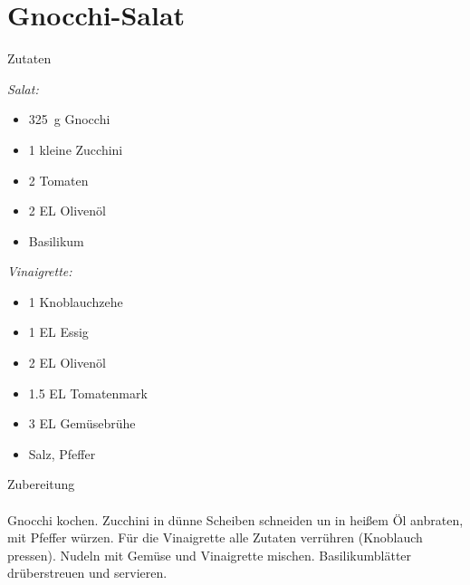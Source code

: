 \section*{Gnocchi-Salat}
\ihead{}\ohead{}
\cfoot{}
{\Large Zutaten}
\begin{multicols}{2}
\textit{Salat:}
\begin{itemize}
    \item \SI{325}{g} Gnocchi
    \item \num{1} kleine Zucchini
    \item \num{2} Tomaten
    \item \num{2} EL Olivenöl
    \item Basilikum
\end{itemize}
\columnbreak
\textit{Vinaigrette:}
\begin{itemize}
    \item \num{1} Knoblauchzehe
    \item \num{1} EL Essig
    \item \num{2} EL Olivenöl
    \item \num{1.5} EL Tomatenmark
    \item \num{3} EL Gemüsebrühe
    \item Salz, Pfeffer
\end{itemize}
\end{multicols}
\noindent
{\Large Zubereitung}\\
\\
Gnocchi kochen.
Zucchini in dünne Scheiben schneiden un in heißem Öl anbraten, mit Pfeffer würzen.
Für die Vinaigrette alle Zutaten verrühren (Knoblauch pressen).
Nudeln mit Gemüse und Vinaigrette mischen.
Basilikumblätter drüberstreuen und servieren. 
